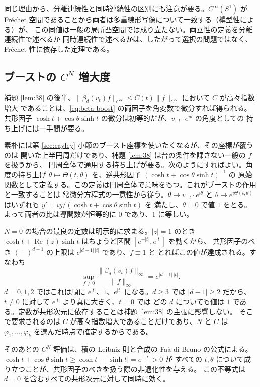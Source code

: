 \documentclass[11pt,a4paper]{article}
\newcommand{\Circ}{S^{1}}
\newcommand{\CN}[1]{\lVert #1 \rVert_{C^{N}}}
\newcommand{\norm}[1]{\lVert #1 \rVert}
\newcommand{\abs}[1]{\lvert #1 \rvert}
\theoremstyle{definition}
\begin{document}
同じ理由から、分離連続性と同時連続性の区別にも注意が要る。$C^\infty(\Circ)$ が
Fr\'echet 空間であることから両者は多重線形写像について一致する（樽型性による）が、
この同値は一般の局所凸空間では成り立たない。両立性の定義を分離連続性で述べるか
同時連続性で述べるかは、したがって選択の問題ではなく、Fr\'echet 性に依存した定理である。

\subsection{\texorpdfstring{ブーストの $C^N$ 増大度}{ブーストの CN 増大度}}
\label{sec:growth}

補題 \ref{lem:38} の後半、$\CN{\beta_d(v_t)f} \le C(t)\CN{f}$ において $C$ が高々指数増大
であることは、\eqref{eq:beta-boost} の両因子を角変数で微分すれば得られる。共形因子
$\cosh t + \cos\theta \sinh t$ の微分は初等的だが、$v_{-t}\cdot e^{i\theta}$ の角度としての
持ち上げには一手間が要る。

素朴には第 \ref{sec:cayley} 小節のブースト座標を使いたくなるが、その座標が覆うのは
開いた上半円周だけであり、補題 \ref{lem:38} は台の条件を課さない一般の $f$ を扱うから、
円周全体で通用する持ち上げが要る。次のようにすればよい。角度の持ち上げ
$\theta \mapsto \Theta(t,\theta)$ を、逆共形因子 $(\cosh t + \cos\theta \sinh t)^{-1}$ の
原始関数として定義する。この定義は円周全体で意味をもつ。これがブーストの作用と一致することは
常微分方程式の一意性から従う。$\theta \mapsto v_{-t}\cdot e^{i\theta}$ と
$\theta \mapsto e^{i\Theta(t,\theta)}$ はいずれも $y' = iy/(\cosh t + \cos\theta\sinh t)$ を
満たし、$\theta = 0$ で値 $1$ をとる。よって両者の比は導関数が恒等的に $0$ であり、$1$ に等しい。

$N = 0$ の場合の最良の定数は明示的に求まる。$\abs{z} = 1$ のとき
$\cosh t + \operatorname{Re}(z)\sinh t$ はちょうど区間 $[e^{-\abs{t}}, e^{\abs{t}}]$ を動くから、
共形因子のべき $(\,\cdot\,)^{d-1}$ の上限は $e^{\abs{d-1}\,\abs{t}}$ であり、$f \equiv 1$ と
とればこの値が達成される。すなわち
\[
  \sup_{f \ne 0} \frac{\norm{\beta_d(v_t)f}_\infty}{\norm{f}_\infty} = e^{\abs{d-1}\,\abs{t}} .
\]
$d = 0, 1, 2$ ではこれは順に $e^{\abs{t}}$、$1$、$e^{\abs{t}}$ になる。$d \ge 3$ では
$\abs{d-1} \ge 2$ だから、$t \ne 0$ に対して $e^{\abs{t}}$ より真に大きく、$t = 0$ では
どの $d$ についても値は $1$ である。定数が共形次元に依存することは補題 \ref{lem:38} の主張に影響しない。
そこで要求されるのは $C$ が高々指数増大であることだけであり、$N$ と $C$ は
$\varphi_1, \dots, \varphi_k$ を選んだ時点で確定するからである。

そのあとの $C^N$ 評価は、積の Leibniz 則と合成の Fa\`a di Bruno の公式による。
$\cosh t + \cos\theta\sinh t \ge \cosh t - \abs{\sinh t} = e^{-\abs{t}} > 0$ が
すべての $t, \theta$ について成り立つことが、共形因子のべきを扱う際の非退化性を与える。
この不等式は $d = 0$ を含むすべての共形次元に対して同時に効く。
\end{document}
